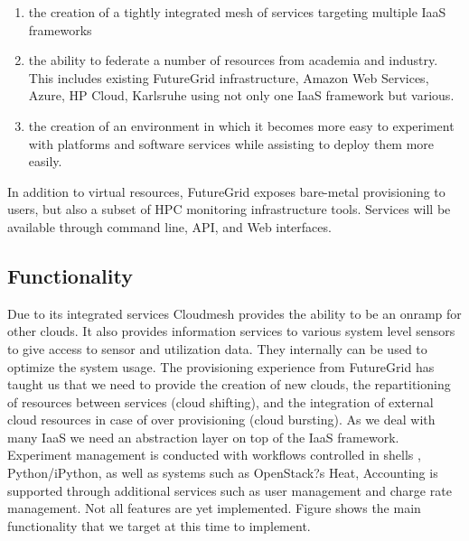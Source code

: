 \documentclass{tex/sig-alternate-2013}
\begin{document}
\begin{enumerate}[leftmargin=*,itemsep=0pt,topsep=0pt]


\item the creation of a tightly integrated mesh of services targeting multiple IaaS frameworks 


\item the ability to federate a number of resources from academia and industry. This includes existing FutureGrid infrastructure, Amazon Web Services, Azure, HP Cloud, Karlsruhe using not only one IaaS framework but various. 


\item the creation of an environment in which it becomes more easy to experiment with platforms and software services while assisting to deploy them more easily.  


\end{enumerate}


In addition to virtual resources, FutureGrid exposes bare-metal provisioning to users, but also a subset of HPC monitoring infrastructure tools. Services will be available through command line, API, and Web interfaces.


\subsection{Functionality}


Due to its integrated services Cloudmesh provides the ability to be an onramp for other clouds. It also provides information services to various system level sensors to give access to sensor and utilization data. They internally can be used to optimize the system usage. The provisioning experience from FutureGrid has taught us that we need to provide the creation of new clouds, the repartitioning of resources between services (cloud shifting), and the integration of external cloud resources in case of over provisioning (cloud bursting). As we deal with many IaaS we need an abstraction layer on top of the IaaS framework. Experiment management is conducted with workflows controlled in shells \cite{cmd3}, Python/iPython, as well as systems such as OpenStack?s Heat, Accounting is supported through additional services such as user management and charge rate management. Not all features are yet implemented. Figure \label{F:cm-func} shows the main functionality that we target at this time to implement.
\end{document}
